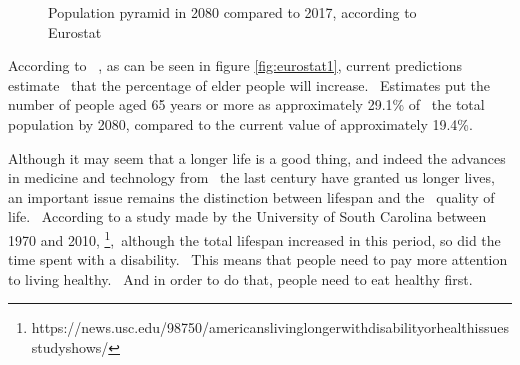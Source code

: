 \begin{figure}[ht]
    \caption{Population pyramid in 2080 compared to 2017, according to Eurostat}
\end{figure}

According to ~\cite{eurostat1}, as can be seen in figure \ref{fig:eurostat1}, current predictions estimate \
that the percentage of elder people will increase. \
Estimates put the number of people aged 65 years or more as approximately 29.1\% of \
the total population by 2080, compared to the current value of approximately 19.4\%.

Although it may seem that a longer life is a good thing, and indeed the advances in medicine and technology from \
the last century have granted us longer lives, an important issue remains the distinction between lifespan and the \
quality of life. \
According to a study made by the University of South Carolina between 1970 and 2010,
\footnote{https://news.usc.edu/98750/americans\-living\-longer\-with\-disability\-or\-health\-issues\-study\-shows/},\
although the total lifespan increased in this period, so did the time spent with a disability. \
This means that people need to pay more attention to living healthy. \
And in order to do that, people need to eat healthy first.
